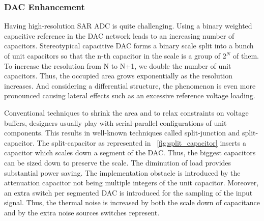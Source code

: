 \subsubsection{DAC Enhancement}
Having high-resolution SAR ADC is quite challenging. Using a binary weighted capacitive reference in the DAC network leads to an increasing number of capacitors. Stereotypical capacitive DAC forms a binary scale split into a bunch of unit capacitors so that the n-th capacitor in the scale is a group of \(2^N\) of them. To increase the resolution from N to N+1, we double the number of unit capacitors. Thus, the occupied area grows exponentially as the resolution increases. And considering a differential structure, the phenomenon is even more pronounced causing lateral effects such as an excessive reference voltage loading.

Conventional techniques to shrink the area and to relax constraints on voltage buffers, designers usually play with serial-parallel configurations of unit components. This results in well-known techniques called split-junction and split-capacitor. The split-capacitor as represented in \figurename~\ref{fig:split_capacitor} inserts a capacitor which scales down a segment of the DAC\@. Thus, the biggest capacitors can be sized down to preserve the scale. The diminution of load provides substantial power saving. The implementation obstacle is introduced by the attenuation capacitor not being multiple integers of the unit capacitor. Moreover, an extra switch per segmented DAC is introduced for the sampling of the input signal. Thus, the thermal noise is increased by both the scale down of capacitance and by the extra noise sources switches represent.

